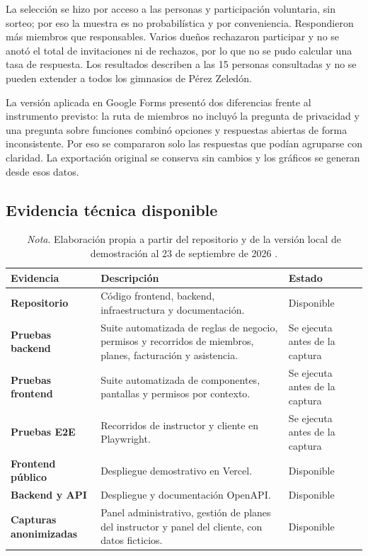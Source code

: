 La selección se hizo por acceso a las personas y participación voluntaria,
sin sorteo; por eso la muestra es no probabilística y por conveniencia.
Respondieron más miembros que responsables. Varios dueños rechazaron
participar y no se anotó el total de invitaciones ni de rechazos, por lo que
no se pudo calcular una tasa de respuesta. Los resultados describen a las
15 personas consultadas y no se pueden extender a todos los gimnasios de
Pérez Zeledón.

La versión aplicada en Google Forms presentó dos diferencias frente al
instrumento previsto: la ruta de miembros no incluyó la pregunta de privacidad y
una pregunta sobre funciones combinó opciones y respuestas abiertas de forma
inconsistente. Por eso se compararon solo las respuestas que podían agruparse
con claridad. La exportación original se conserva sin cambios y los gráficos
se generan desde esos datos.

\subsection{Evidencia técnica disponible}

\begin{table}[htbp]
\caption{Inventario de evidencia técnica}
\begin{tabularx}{\textwidth}{>{\bfseries}p{4cm}X p{3cm}}
\toprule
Evidencia & Descripción & Estado \\
\midrule
Repositorio & Código frontend, backend, infraestructura y documentación. & Disponible \\
Pruebas backend & Suite automatizada de reglas de negocio, permisos y recorridos de miembros, planes, facturación y asistencia. & Se ejecuta antes de la captura \\
Pruebas frontend & Suite automatizada de componentes, pantallas y permisos por contexto. & Se ejecuta antes de la captura \\
Pruebas E2E & Recorridos de instructor y cliente en Playwright. & Se ejecuta antes de la captura \\
Frontend público & Despliegue demostrativo en Vercel. & Disponible \\
Backend y API & Despliegue y documentación OpenAPI. & Disponible \\
Capturas anonimizadas & Panel administrativo, gestión de planes del instructor y panel del cliente, con datos ficticios. & Disponible \\
\bottomrule
\end{tabularx}
\caption*{\textit{Nota}. Elaboración propia a partir del repositorio y de la versión local de demostración al 23 de septiembre de 2026 \parencite{gymhub_repo}.}
\end{table}

